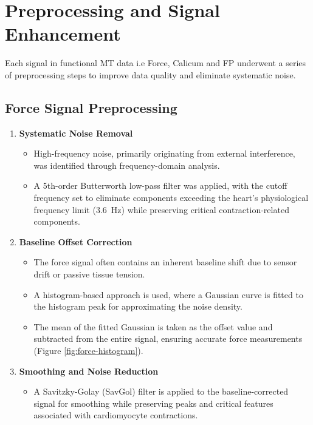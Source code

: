 \documentclass{report}
\begin{document}
   \section{Preprocessing and Signal Enhancement}
   \label{signal-enhancement}
   Each signal in functional MT data i.e Force, Calicum and FP underwent a series of preprocessing steps to improve data quality and eliminate systematic noise.
   \subsection{Force Signal Preprocessing}
   \label{sec:force-prep}

    \begin{enumerate}
        \item \textbf{Systematic Noise Removal}  
        \begin{itemize}
            \item High-frequency noise, primarily originating from external interference, was identified through frequency-domain analysis.
            \item A 5th-order Butterworth low-pass filter was applied, with the cutoff frequency set to eliminate components exceeding the heart's physiological frequency limit (\SI{3.6}{\hertz}) while preserving critical contraction-related components.
        \end{itemize}
    
        \item \textbf{Baseline Offset Correction}  
        \begin{itemize}
            \item The force signal often contains an inherent baseline shift due to sensor drift or passive tissue tension.
            \item A histogram-based approach is used, where a Gaussian curve is fitted to the histogram peak for approximating the noise density.
            \item The mean of the fitted Gaussian is taken as the offset value and subtracted from the entire signal, ensuring accurate force measurements (Figure \ref{fig:force-histogram}).
        \end{itemize}
    
        \item \textbf{Smoothing and Noise Reduction}  
        \begin{itemize}
            \item A Savitzky-Golay (SavGol) \cite{SavitzkyGolayWiki} filter is applied to the baseline-corrected signal for smoothing while preserving peaks and critical features associated with cardiomyocyte contractions.
        \end{itemize}
    \end{enumerate}
    
\end{document}
